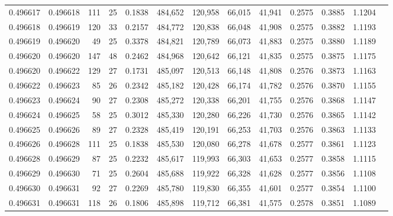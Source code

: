 \begin{tabular}{rrrrrrrrrrrrr}
0.496617 & 0.496618 & 111 &  25 &                                     0.1838 & 484,652 & 120,958 &  66,015 &  41,941 & 0.2575 & 0.3885 & 1.1204 \\
0.496618 & 0.496619 & 120 &  33 &                                     0.2157 & 484,772 & 120,838 &  66,048 &  41,908 & 0.2575 & 0.3882 & 1.1193 \\
0.496619 & 0.496620 &  49 &  25 &                                     0.3378 & 484,821 & 120,789 &  66,073 &  41,883 & 0.2575 & 0.3880 & 1.1189 \\
0.496620 & 0.496620 & 147 &  48 &                                     0.2462 & 484,968 & 120,642 &  66,121 &  41,835 & 0.2575 & 0.3875 & 1.1175 \\
0.496620 & 0.496622 & 129 &  27 &                                     0.1731 & 485,097 & 120,513 &  66,148 &  41,808 & 0.2576 & 0.3873 & 1.1163 \\
0.496622 & 0.496623 &  85 &  26 &                                     0.2342 & 485,182 & 120,428 &  66,174 &  41,782 & 0.2576 & 0.3870 & 1.1155 \\
0.496623 & 0.496624 &  90 &  27 &                                     0.2308 & 485,272 & 120,338 &  66,201 &  41,755 & 0.2576 & 0.3868 & 1.1147 \\
0.496624 & 0.496625 &  58 &  25 &                                     0.3012 & 485,330 & 120,280 &  66,226 &  41,730 & 0.2576 & 0.3865 & 1.1142 \\
0.496625 & 0.496626 &  89 &  27 &                                     0.2328 & 485,419 & 120,191 &  66,253 &  41,703 & 0.2576 & 0.3863 & 1.1133 \\
0.496626 & 0.496628 & 111 &  25 &                                     0.1838 & 485,530 & 120,080 &  66,278 &  41,678 & 0.2577 & 0.3861 & 1.1123 \\
0.496628 & 0.496629 &  87 &  25 &                                     0.2232 & 485,617 & 119,993 &  66,303 &  41,653 & 0.2577 & 0.3858 & 1.1115 \\
0.496629 & 0.496630 &  71 &  25 &                                     0.2604 & 485,688 & 119,922 &  66,328 &  41,628 & 0.2577 & 0.3856 & 1.1108 \\
0.496630 & 0.496631 &  92 &  27 &                                     0.2269 & 485,780 & 119,830 &  66,355 &  41,601 & 0.2577 & 0.3854 & 1.1100 \\
0.496631 & 0.496631 & 118 &  26 &                                     0.1806 & 485,898 & 119,712 &  66,381 &  41,575 & 0.2578 & 0.3851 & 1.1089 \\

\end{tabular}
